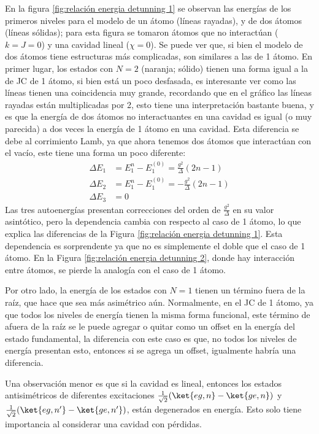 En la figura \ref{fig:relación energia detunning 1} se observan las energías de los primeros niveles para el modelo de un átomo (líneas rayadas), y de dos átomos (líneas sólidas); para esta figura se tomaron átomos que no interactúan ($k=J=0$) y una cavidad lineal ($\chi=0$). Se puede ver que, si bien el modelo de dos átomos tiene estructuras más complicadas, son similares a las de 1 átomo. En primer lugar, los estados con $N=2$ (naranja; sólido) tienen una forma igual a la de JC de 1 átomo, si bien está un poco desfasada, es interesante ver como las líneas tienen una coincidencia muy grande, recordando que en el gráfico las líneas rayadas están multiplicadas por 2, esto tiene una interpretación bastante buena, y es que la energía de dos átomos no interactuantes en una cavidad es igual (o muy parecida) a dos veces la energía de 1 átomo en una cavidad. Esta diferencia se debe al corrimiento Lamb, ya que ahora tenemos dos átomos que interactúan con el vacío, este tiene una forma un poco diferente:
\begin{equation}
    \begin{aligned}
        \Delta E_{1}&=E^{n}_1-E^{(0)}_1=\frac{g^2}{\Delta}(2n-1) \\
        \Delta E_{2}&=E^{n}_1-E^{(0)}_1=-\frac{g^2}{\Delta}(2n-1) \\
        \Delta E_3 &=0
    \end{aligned}
\end{equation}
Las tres autoenergías presentan correcciones del orden de $\frac{g^2}{\Delta}$ en su valor asintótico, pero la dependencia cambia con respecto al caso de 1 átomo, lo que explica las diferencias de la Figura \ref{fig:relación energia detunning 1}. Esta dependencia es sorprendente ya que no es simplemente el doble que el caso de 1 átomo. En la Figura \ref{fig:relación energia detunning 2}, donde hay interacción entre átomos, se pierde la analogía con el caso de 1 átomo.

Por otro lado, la energ\'ia de los estados con $N=1$ tienen un t\'ermino fuera de la raíz, que hace que sea más asim\'etrico a\'un. Normalmente, en el JC de 1 átomo, ya que todos los niveles de energía tienen la misma forma funcional, este término de afuera de la raíz se le puede agregar o quitar como un offset en la energía del estado fundamental, la diferencia con este caso es que, no todos los niveles de energía presentan esto, entonces si se agrega un offset, igualmente habría una diferencia. 

Una observación menor es que si la cavidad es lineal, entonces los estados antisimétricos de diferentes excitaciones $\frac{1}{\sqrt{2}}(\ket{eg,n}-\ket{ge,n})$ y $\frac{1}{\sqrt{2}}(\ket{eg,n'}-\ket{ge,n'})$, están degenerados en energía. Esto solo tiene importancia al considerar una cavidad con pérdidas.


